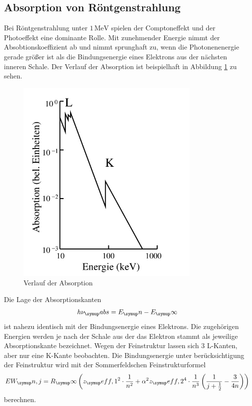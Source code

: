 \subsection{Absorption von Röntgenstrahlung}
Bei Röntgenstrahlung unter $1 \,\si{\mega\electronvolt}$ spielen der Comptoneffekt
und der Photoeffekt eine dominante Rolle.
Mit zunehmender Energie nimmt der Absobtionskoeffizient ab und nimmt
sprunghaft zu, wenn die Photonenenergie gerade größer ist als die Bindungsenergie
eines Elektrons aus der nächsten inneren Schale.
Der Verlauf der Absorption ist beispielhaft in Abbildung \ref{fig:absorb} zu sehen.
\begin{figure}
  \centering
  \includegraphics[width=0.8\textwidth]{bilder/absorb.pdf}
  \caption{Verlauf der Absorption\cite{V602}}
  \label{fig:absorb}
\end{figure}
Die Lage der Absorptionskanten
\begin{equation*}
  h\nu_\su{abs} = E_\su{n} - E_\su{\infty}
\end{equation*}
ist nahezu identisch mit der Bindungsenergie eines Elektrons. Die zugehörigen
Energien werden je nach der Schale aus der das Elektron stammt als jeweilige
Absorptionskante bezeichnet. %
Wegen der Feinstruktur lassen sich 3 L-Kanten, aber nur eine K-Kante beobachten.
Die Bindungsenergie unter berücksichtigung der Feinstruktur wird mit der
Sommerfeldschen Feinstrukturformel
\begin{equation}
  EW_\su{n, j}=R_\su{\infty}\left(z_\su{eff,1}^2\cdot\frac{1}{n^2}
  +\alpha^2 z_\su{eff,2}^4\cdot\frac{1}{n^3}\left(\frac{1}{j+\frac{1}{2}}-
  \frac{3}{4n}\right)\right)
  \label{sommerfeld}
\end{equation}
berechnen.

